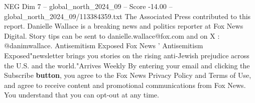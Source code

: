 \begin{textsample}{NEG Dim 7 – global\_north\_2024\_09 – Score -14.00 – global\_north\_2024\_09/113384359.txt}
The Associated Press contributed to this report.
Danielle Wallace is a breaking news and politics reporter at Fox News Digital.
Story tips can be sent to danielle.wallace@fox.com and on X : @danimwallace.
Antisemitism Exposed Fox News ' Antisemitism Exposed"newsletter brings you stories on the rising anti-Jewish prejudice across the U.S. and the world."Arrives Weekly By entering your email and clicking the Subscribe \textbf{button}, you agree to the Fox News Privacy Policy and Terms of Use, and agree to receive content and promotional communications from Fox News.
You understand that you can opt-out at any time.

\end{textsample}
